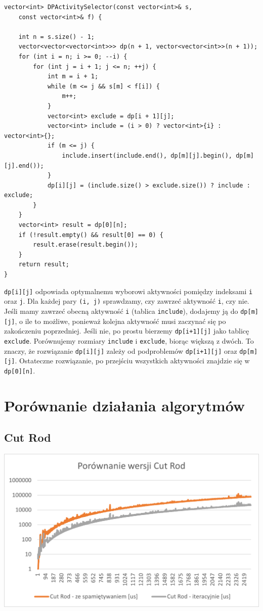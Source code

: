 \documentclass{article}
\begin{document}
\begin{verbatim}
vector<int> DPActivitySelector(const vector<int>& s, 
    const vector<int>& f) {
    
    int n = s.size() - 1;
    vector<vector<vector<int>>> dp(n + 1, vector<vector<int>>(n + 1));
    for (int i = n; i >= 0; --i) {
        for (int j = i + 1; j <= n; ++j) {
            int m = i + 1;
            while (m <= j && s[m] < f[i]) {
                m++;
            }
            vector<int> exclude = dp[i + 1][j];
            vector<int> include = (i > 0) ? vector<int>{i} : vector<int>{};
            if (m <= j) {
                include.insert(include.end(), dp[m][j].begin(), dp[m][j].end());
            }
            dp[i][j] = (include.size() > exclude.size()) ? include : exclude;
        }
    }
    vector<int> result = dp[0][n];
    if (!result.empty() && result[0] == 0) {
        result.erase(result.begin());
    }
    return result;
}
\end{verbatim}

\texttt{dp[i][j]} odpowiada optymalnemu wyborowi aktywności pomiędzy indeksami \texttt{i} oraz \texttt{j}. Dla każdej pary \texttt{(i, j)} sprawdzamy, czy zawrzeć aktywność \texttt{i}, czy nie. Jeśli mamy zawrzeć obecną aktywność \texttt{i} (tablica \texttt{include}), dodajemy ją do \texttt{dp[m][j]}, o ile to możliwe, ponieważ kolejna aktywność musi zaczynać się po zakończeniu poprzedniej. Jeśli nie, po prostu bierzemy \texttt{dp[i+1][j]} jako tablicę \texttt{exclude}. Porównujemy rozmiary \texttt{include} i \texttt{exclude}, biorąc większą z dwóch. To znaczy, że rozwiązanie \texttt{dp[i][j]} zależy od podproblemów \texttt{dp[i+1][j]} oraz \texttt{dp[m][j]}. Ostateczne rozwiązanie, po przejściu wszystkich aktywności znajdzie się w \texttt{dp[0][n]}.

\section{Porównanie działania algorytmów}

\subsection{Cut Rod}

\begin{center}
    \includegraphics[width=1\textwidth]{Cut Rod.png}
\end{center}
\end{document}
